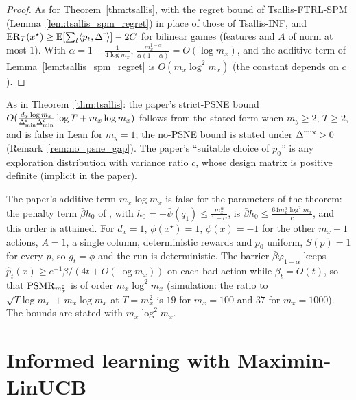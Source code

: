 \begin{proof}
  \leanok
  As for Theorem~\ref{thm:tsallis}, with the regret bound of Tsallis-FTRL-SPM
  (Lemma~\ref{lem:tsallis_spm_regret}) in place of those of Tsallis-INF, and
  $\mathrm{ER}_T(x^\star) \ge \mathbb{E}[\sum_t \langle p_t, \Delta^{\mathrm{r}}\rangle] - 2C$ for bilinear games (features and
  $A$ of norm at most $1$). With $\alpha = 1 - \frac{1}{4 \log m_x}$,
  $\frac{m_x^{1 - \alpha}}{\alpha(1 - \alpha)} = O(\log m_x)$, and the additive term of
  Lemma~\ref{lem:tsallis_spm_regret} is $O(m_x \log^2 m_x)$ (the constant depends on $c$).
\end{proof}

\begin{remark}
  \label{rem:tsallis_bilinear_statement}
  As in Theorem~\ref{thm:tsallis}: the paper's strict-PSNE bound
  $O(\frac{d_x \log m_x}{\Delta^{\mathrm{r}}_{\min} \Delta^{\mathrm{c}}_{\min}} \log T + m_x \log m_x)$ follows from the stated form when
  $m_y \ge 2$, $T \ge 2$, and is false in Lean for $m_y = 1$; the no-PSNE bound is stated under
  $\Delta^{\mathrm{mix}} > 0$ (Remark~\ref{rem:no_psne_gap}). The paper's ``suitable choice of $p_0$'' is any
  exploration distribution with variance ratio $c$, whose design matrix is positive definite
  (implicit in the paper).

  The paper's additive term $m_x \log m_x$ is false for the parameters of the theorem: the
  penalty term $\bar\beta h_0$ of \cite[Eq.~(24)]{ito2024adaptive}, with $h_0 = -\bar\psi(q_1) \le
  \frac{m_x^\alpha}{1 - \alpha}$, is $\bar\beta h_0 \le \frac{64 m_x^\alpha \log^2 m_x}{c}$, and
  this order is attained. For $d_x = 1$, $\phi(x^\star) = 1$, $\phi(x) = -1$ for the other
  $m_x - 1$ actions, $A = 1$, a single column, deterministic rewards and $p_0$ uniform, $S(p) = 1$
  for every $p$, so $g_t = \phi$ and the run is deterministic. The barrier $\bar\beta
  \varphi_{1 - \alpha}$ keeps $\hat p_t(x) \ge e^{-1} \bar\beta / (4t + O(\log m_x))$ on each bad
  action while $\beta_t = O(t)$, so that $\mathrm{PSMR}_{m_x^2}$ is of order $m_x \log^2 m_x$ (simulation:
  the ratio to $\sqrt{T \log m_x} + m_x \log m_x$ at $T = m_x^2$ is $19$ for $m_x = 100$ and $37$
  for $m_x = 1000$). The bounds are stated with $m_x \log^2 m_x$.
\end{remark}

\section{Informed learning with Maximin-LinUCB}


